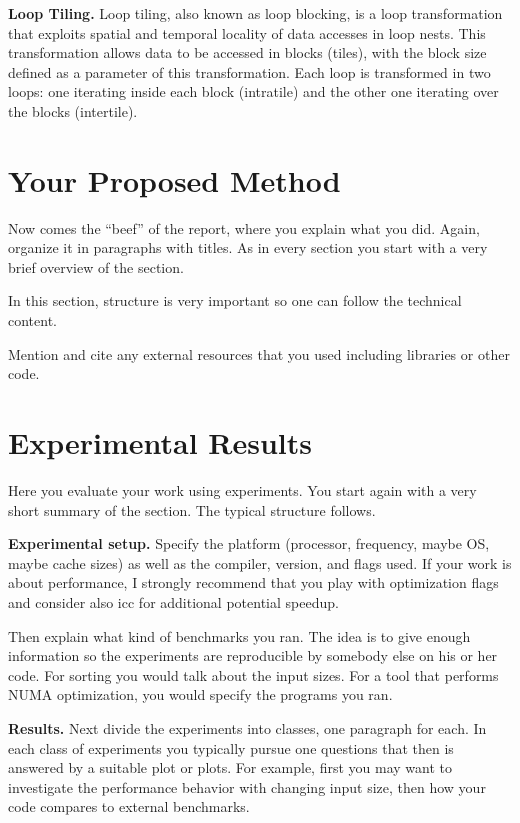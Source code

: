 \documentclass[conference]{IEEEtran}
\newcommand{\mypar}[1]{{\bf #1.}}
\begin{document}
\mypar{Loop Tiling}
Loop tiling, also known as loop blocking, is a loop transformation that exploits spatial and temporal locality of data accesses in loop nests. This transformation allows data to be accessed in blocks (tiles), with the block size defined as a parameter of this transformation. Each loop is transformed in two loops: one iterating inside each block (intratile) and the other one iterating over the blocks (intertile). \cite{loop-tiling}

\section{Your Proposed Method}\label{sec:yourmethod}

Now comes the ``beef'' of the report, where you explain what you
did. Again, organize it in paragraphs with titles. As in every section
you start with a very brief overview of the section.

In this section, structure is very important so one can follow the technical content.

Mention and cite any external resources that you used including libraries or other code.

\section{Experimental Results}\label{sec:exp}

Here you evaluate your work using experiments. You start again with a
very short summary of the section. The typical structure follows.

\mypar{Experimental setup} Specify the platform (processor, frequency, maybe OS, maybe cache sizes)
as well as the compiler, version, and flags used. If your work is about performance, 
I strongly recommend that you play with optimization flags and consider also icc for additional potential speedup.

Then explain what kind of benchmarks you ran. The idea is to give enough information so the experiments are reproducible by somebody else on his or her code.
For sorting you would talk about the input sizes. For a tool that performs NUMA optimization, you would specify the programs you ran.

\mypar{Results}
Next divide the experiments into classes, one paragraph for each. In each class of experiments you typically pursue one questions that then is answered by a suitable plot or plots. For example, first you may want to investigate the performance behavior with changing input size, then how your code compares to external benchmarks.
\end{document}
